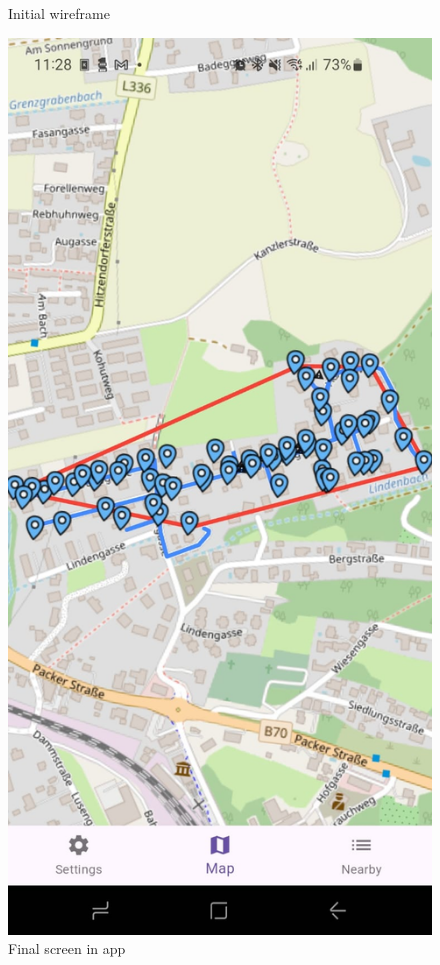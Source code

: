 \begin{figure}[H]
\begin{minipage}{0.3\textwidth}
        \caption{Initial wireframe}
    \end{minipage}
    \hspace{2cm}
    \begin{minipage}{0.3\textwidth}
        \centering
        \includegraphics[width=\textwidth]{images/paul/wireframes/finalMap.jpeg}
        \caption{Final screen in app}
    \end{minipage}
\end{figure}

